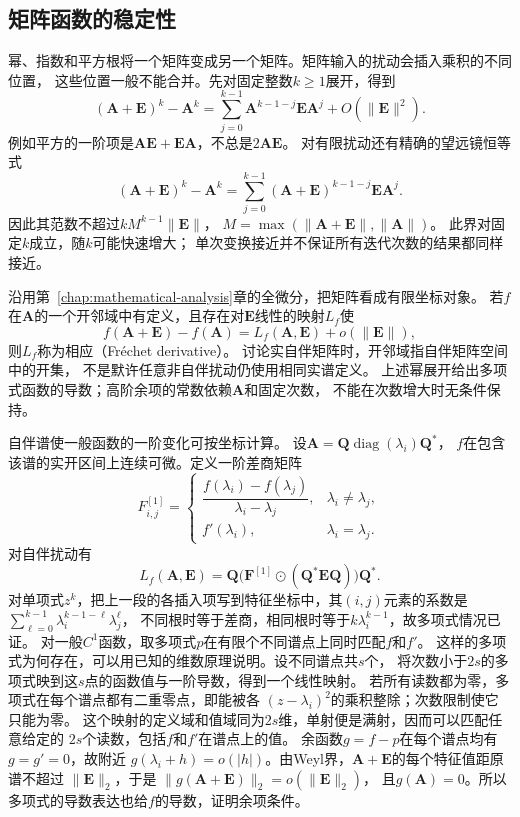 \subsection{矩阵函数的稳定性}
\label{sec:linear-algebra-matrix-function-stability}
\label{sec:ch06-matrix-function-stability}


幂、指数和平方根将一个矩阵变成另一个矩阵。矩阵输入的扰动会插入乘积的不同位置，
这些位置一般不能合并。先对固定整数$k\geq1$展开，得到
\[
 (\bm A+\bm E)^k-\bm A^k
 =\sum_{j=0}^{k-1}\bm A^{k-1-j}\bm E\bm A^j+O(\lVert\bm E\rVert^2).
\]
例如平方的一阶项是$\bm A\bm E+\bm E\bm A$，不总是$2\bm A\bm E$。
对有限扰动还有精确的望远镜恒等式
\[
 (\bm A+\bm E)^k-\bm A^k
 =\sum_{j=0}^{k-1}(\bm A+\bm E)^{k-1-j}\bm E\bm A^j.
\]
因此其范数不超过$kM^{k-1}\lVert\bm E\rVert$，
$M=\max(\lVert\bm A+\bm E\rVert,\lVert\bm A\rVert)$。
此界对固定$k$成立，随$k$可能快速增大；
单次变换接近并不保证所有迭代次数的结果都同样接近。

沿用第~\ref{chap:mathematical-analysis}章的全微分，把矩阵看成有限坐标对象。
若$f$在$\bm A$的一个开邻域中有定义，且存在对$\bm E$线性的映射$L_f$使
\begin{equation}
 f(\bm A+\bm E)-f(\bm A)
 =L_f(\bm A,\bm E)+o(\lVert\bm E\rVert),
 \label{eq:matrix-analysis-frechet-derivative}
\end{equation}
则$L_f$称为相应（Fréchet derivative）。
讨论实自伴矩阵时，开邻域指自伴矩阵空间中的开集，
不是默许任意非自伴扰动仍使用相同实谱定义。
上述幂展开给出多项式函数的导数；高阶余项的常数依赖$\bm A$和固定次数，
不能在次数增大时无条件保持。

自伴谱使一般函数的一阶变化可按坐标计算。
设$\bm A=\bm Q\operatorname{diag}(\lambda_i)\bm Q^*$，
$f$在包含该谱的实开区间上连续可微。定义一阶差商矩阵
\[
 F^{[1]}_{i,j}=
 \begin{cases}
  \dfrac{f(\lambda_i)-f(\lambda_j)}{\lambda_i-\lambda_j},
    &\lambda_i\neq\lambda_j,\\[5pt]
  f'(\lambda_i),&\lambda_i=\lambda_j.
 \end{cases}
\]
对自伴扰动有
\begin{equation}
 L_f(\bm A,\bm E)
 =\bm Q\bigl(\bm F^{[1]}\odot(\bm Q^*\bm E\bm Q)\bigr)\bm Q^*.
 \label{eq:matrix-analysis-frechet-divided-difference}
\end{equation}
对单项式$z^k$，把上一段的各插入项写到特征坐标中，其$(i,j)$元素的系数是
$\sum_{\ell=0}^{k-1}\lambda_i^{k-1-\ell}\lambda_j^\ell$，
不同根时等于差商，相同根时等于$k\lambda_i^{k-1}$，故多项式情况已证。
对一般$C^1$函数，取多项式$p$在有限个不同谱点上同时匹配$f$和$f'$。
这样的多项式为何存在，可以用已知的维数原理说明。设不同谱点共$s$个，
将次数小于$2s$的多项式映到这$s$点的函数值与一阶导数，得到一个线性映射。
若所有读数都为零，多项式在每个谱点都有二重零点，即能被各
$(z-\lambda_i)^2$的乘积整除；次数限制使它只能为零。
这个映射的定义域和值域同为$2s$维，单射便是满射，因而可以匹配任意给定的
$2s$个读数，包括$f$和$f'$在谱点上的值。
余函数$g=f-p$在每个谱点均有$g=g'=0$，故附近
$g(\lambda_i+h)=o(|h|)$。由Weyl界，$\bm A+\bm E$的每个特征值距原谱不超过
$\lVert\bm E\rVert_2$，于是
$\lVert g(\bm A+\bm E)\rVert_2=o(\lVert\bm E\rVert_2)$，
且$g(\bm A)=0$。所以多项式的导数表达也给$f$的导数，证明余项条件。

